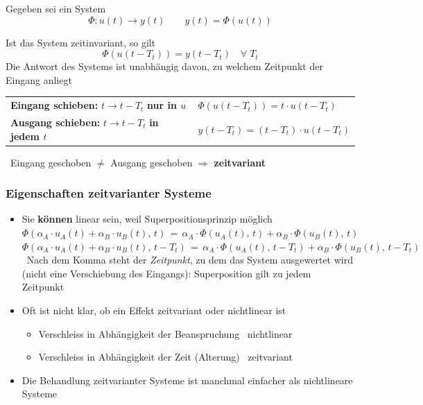 Gegeben sei ein System 
$$\Phi: u(t) \rightarrow y(t) \qquad y(t) = \Phi(u(t))$$

Ist das System zeitinvariant, so gilt
$$ \boxed{ \Phi(u(t-T_t)) = y(t - T_t) \quad \forall \; T_t } $$
Die Antwort des Systems ist unabhängig davon, zu welchem Zeitpunkt der Eingang anliegt

\vspace{0.2cm}


\begin{tabular}{ll}
	\textbf{Eingang schieben:} $t \to t - T_t$ \textbf{nur in $u$}
		& $\Phi(u(t - T_t)) = t \cdot u(t - T_t)$ \\[2pt]
	\textbf{Ausgang schieben:} $t \to t - T_t$ \textbf{in jedem $t$}
		& $y(t - T_t) = (t - T_t) \cdot u(t - T_t)$
\end{tabular}

\vspace{0.1cm}
\textrightarrow\ Eingang geschoben $\neq$ Ausgang geschoben $\Rightarrow$ \textbf{zeitvariant}


\subsubsection{Eigenschaften zeitvarianter Systeme}

\begin{itemize}
	\setlength\itemsep{5pt}

	\item Sie \textbf{können} linear sein, weil Superpositionsprinzip möglich \\
		$\Phi( \alpha_A \cdot u_A(t) + \alpha_B \cdot u_B(t), \, t)  \, = \, \alpha_A \cdot \Phi(u_A(t), \, t) + \alpha_B \cdot \Phi(u_B(t), \, t)$ \\
		$\Phi( \alpha_A \cdot u_A(t) + \alpha_B \cdot u_B(t), \, t - T_t)  \, = \, \alpha_A \cdot \Phi(u_A(t), \, t - T_t) + \alpha_B \cdot \Phi(u_B(t), \, t - T_t)$ \\
		\textrightarrow\ Nach dem Komma steht der \emph{Zeitpunkt}, zu dem das System ausgewertet wird (nicht eine Verschiebung des Eingangs): Superposition gilt zu jedem Zeitpunkt

	\item Oft ist nicht klar, ob ein Effekt zeitvariant oder nichtlinear ist
	\begin{itemize}
		\item Verschleiss in Abhängigkeit der Beanspruchung \textrightarrow\ nichtlinear
		\item Verschleiss in Abhängigkeit der Zeit (Alterung) \textrightarrow\ zeitvariant
	\end{itemize}
		

	\item Die Behandlung zeitvarianter Systeme ist manchmal einfacher als nichtlineare Systeme 
\end{itemize}


